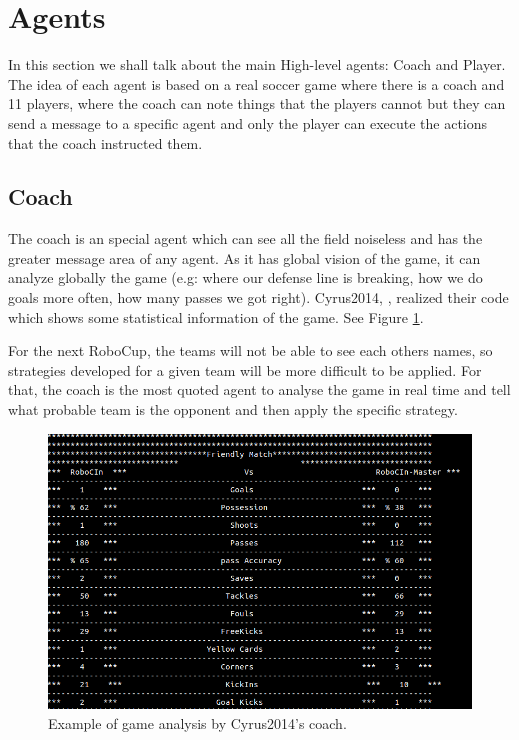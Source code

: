 \section{Agents}\label{section:agents}
In this section we shall talk about the main High-level agents: Coach and Player. The idea of each agent is based on a real soccer game where there is a coach and 11 players, where the coach can note things that the players cannot but they can send a message to a specific agent and only the player can execute the actions that the coach instructed them.

\subsection{Coach}\label{section:coach}
The coach is an special agent which can see all the field noiseless and has the greater message area of any agent. As it has global vision of the game, it can analyze globally the game (e.g: where our defense line is breaking, how we do goals more often, how many passes we got right). Cyrus2014, \cite{cyrus2014}, realized their code which shows some statistical information of the game. See Figure \ref{fig:cyrus_coach}.

For the next RoboCup, the teams will not be able to see each others names, so strategies developed for a given team will be more difficult to be applied. For that, the coach is the most quoted agent to analyse the game in real time and tell what probable team is the opponent and then apply the specific strategy.
\begin{figure}[H]
    \centering
    \includegraphics[scale=0.5]{images/cyrus_coach.png}
    \caption{Example of game analysis by Cyrus2014's coach.}
    \label{fig:cyrus_coach}
\end{figure}


